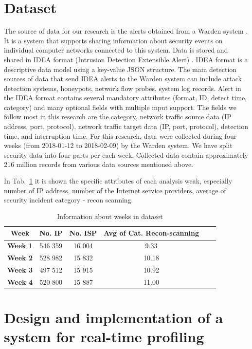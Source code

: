 \documentclass[conference, a4paper]{IEEEtran}
\begin{document}
\section{Dataset}
The source of data for our research is the alerts obtained from a Warden system \cite{kacha2015warden}. It is a system that supports sharing information about security events on individual computer networks connected to this system. Data is stored and shared in IDEA format (Intrusion Detection Extensible Alert) \cite{kacha2014idea}. IDEA format is a descriptive data model using a key-value JSON structure. The main detection sources of data that send IDEA alerts to the Warden system can include attack detection systems, honeypots, network flow probes, system log records. Alert in the IDEA format contains several mandatory attributes (format, ID, detect time, category) \cite{kacha2013idea} and many optional fields with multiple input support. The fields we follow most in this research are the category, network traffic source data (IP address, port, protocol), network traffic target data (IP, port, protocol), detection time, and interruption time. For this research, data were collected during four weeks (from 2018-01-12 to 2018-02-09) by the Warden system. We have split security data into four parts per each week. Collected data contain approximately 216 million records from various data sources mentioned above.

In Tab.~\ref{tab:dataset_categories} it is shown the specific attributes of each analysis weak, especially number of IP address, number of the Internet service providers, average of security incident category - recon scanning. 

\begin{table}[ht]
\centering
\caption{Information about weeks in dataset}
\label{tab:dataset_categories}
 \begin{tabular}{|c|c|c|c|c|c|} 
    \hline
    Week & No. IP & No. ISP & Avg of Cat. Recon-scanning  \\
    \hline
    \textbf{Week 1} & 546 359 & 16 004 & 9.33 \\
    \textbf{Week 2} & 528 982 & 15 832 & 10.18 \\
    \textbf{Week 3} & 497 512 & 15 915 & 10.92 \\
    \textbf{Week 4} & 520 800 & 15 887 & 11.00 \\
    \hline
 \end{tabular}
\end{table}


\section{Design and implementation of a system for real-time profiling}
\end{document}

